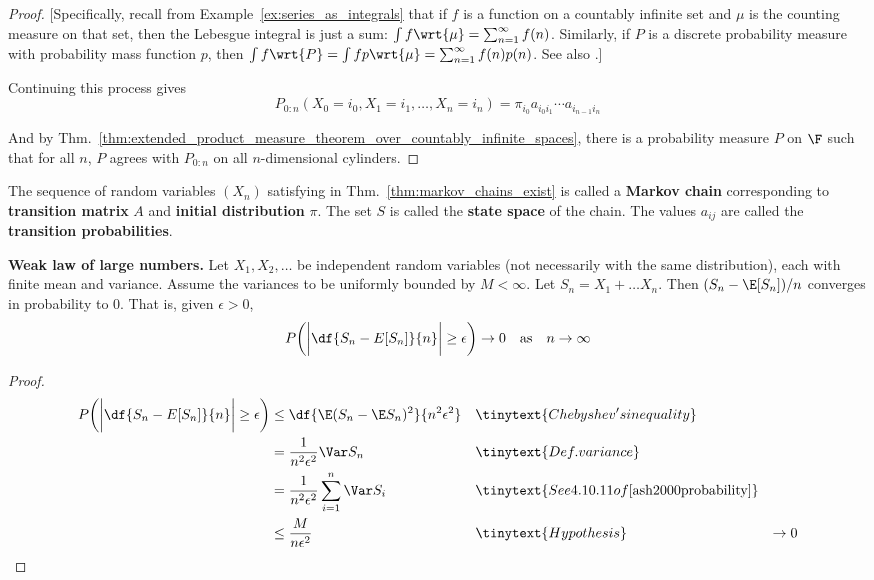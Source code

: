 \documentclass{article} %
\begin{document}
\begin{proof}
{\scriptsize [Specifically, recall from Example~\ref{ex:series_as_integrals} that if $f$ is a function on a countably infinite set and $\mu$ is the counting measure on that set, then the Lebesgue integral is just a sum: $\int f \wrt{\mu} = \sum_{n=1}^\infty f(n)$.  Similarly, if $P$ is a discrete probability measure with probability mass function $p$, then $\int f \wrt{P} = \int fp \wrt{\mu} = \sum_{n=1}^\infty f(n)p(n)$.  See also \cite[4.10.3(d)]{ash2000probability}.]}

Continuing this process gives
\[P_{0:n}(X_0=i_0, X_1=i_1, \hdots, X_n=i_n) = \pi_{i_0} a_{i_0i_1} \cdots a_{i_{n-1}i_n}\]

And by Thm.~\ref{thm:extended_product_measure_theorem_over_countably_infinite_spaces}, there is a probability measure $P$ on $\F$ such that for all $n$, $P$ agrees with $P_{0:n}$ on all $n$-dimensional cylinders.
\end{proof}

\begin{remark}
The sequence of random variables $(X_n)$ satisfying  in Thm.~\ref{thm:markov_chains_exist} is called a \textbf{Markov chain} corresponding to \textbf{transition matrix} $A$ and \textbf{initial distribution} $\pi$. The set $S$ is called the \textbf{state space} of the chain.  The values $a_{ij}$ are called the \textbf{transition probabilities}.
\end{remark}

\begin{theorem}\textbf{Weak law of large numbers.} Let $X_1, X_2, \hdots$ be independent random variables (not necessarily with the same distribution), each with finite mean and variance. Assume the variances to be uniformly bounded by $M < \infty$.  Let $S_n = X_1 + \hdots X_n$. Then $(S_n - \E[S_n])/n$ converges in probability to 0. That is, given $\epsilon > 0$,
\[  P \bigg(\bigg|\df{S_n - E[S_n]}{n} \bigg|\geq \epsilon \bigg) \to 0 \quad \text{as} \quad n \to \infty \]
\label{thm:weak_law_of_large_numbers}
\end{theorem}

\begin{proof}
\begin{align*}
P \bigg(\bigg|\df{S_n - E[S_n]}{n} \bigg|\geq \epsilon \bigg) &\leq  \df{\E(S_n - \E S_n)^2}{n^2 \epsilon^2} && \tinytext{Chebyshev's inequality}	\\
&= \frac{1}{n^2 \epsilon^2} \Var S_n && \tinytext{Def. variance} \\
&= \frac{1}{n^2 \epsilon^2} \sum_{i=1}^n \Var S_i && \tinytext{See 4.10.11 of \cite{ash2000probability}} \\
& \leq \frac{M}{n \epsilon^2}&& \tinytext{Hypothesis}
& \to 0
\end{align*}

\end{proof}
\end{document}
